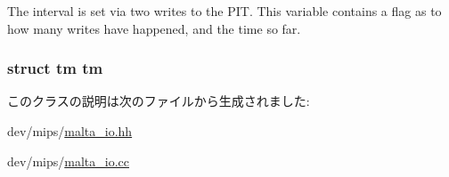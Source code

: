 \label{classMaltaIO_ac2f6e48e9ea7cdd01d0d4855725107d6}
The interval is set via two writes to the PIT. This variable contains a flag as to how many writes have happened, and the time so far. \hypertarget{classMaltaIO_a2182a1f5ef743c17d71096c490feb801}{
\subsubsection[{tm}]{\setlength{\rightskip}{0pt plus 5cm}struct {\bf tm} {\bf tm}}}
\label{classMaltaIO_a2182a1f5ef743c17d71096c490feb801}


このクラスの説明は次のファイルから生成されました:\begin{DoxyCompactItemize}
\item 
dev/mips/\hyperlink{malta__io_8hh}{malta\_\-io.hh}\item 
dev/mips/\hyperlink{malta__io_8cc}{malta\_\-io.cc}\end{DoxyCompactItemize}
